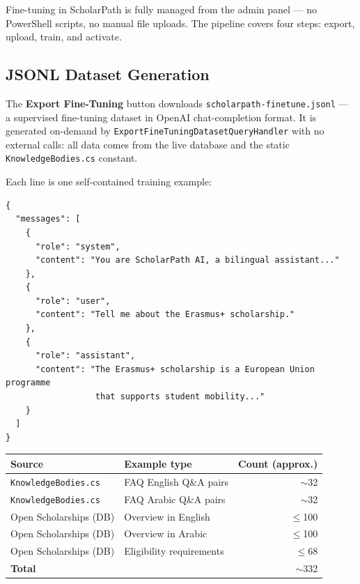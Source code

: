 \documentclass[11pt,a4paper]{article}
\begin{document}
Fine-tuning in ScholarPath is fully managed from the admin panel --- no
PowerShell scripts, no manual file uploads. The pipeline covers four steps:
export, upload, train, and activate.

\subsection{JSONL Dataset Generation}

The \textbf{Export Fine-Tuning} button downloads \texttt{scholarpath-finetune.jsonl} ---
a supervised fine-tuning dataset in OpenAI chat-completion format.
It is generated on-demand by \texttt{ExportFineTuningDatasetQueryHandler} with no
external calls: all data comes from the live database and
the static \texttt{KnowledgeBodies.cs} constant.

Each line is one self-contained training example:

\begin{lstlisting}[language={},caption={Single JSONL training example (truncated)}]
{
  "messages": [
    {
      "role": "system",
      "content": "You are ScholarPath AI, a bilingual assistant..."
    },
    {
      "role": "user",
      "content": "Tell me about the Erasmus+ scholarship."
    },
    {
      "role": "assistant",
      "content": "The Erasmus+ scholarship is a European Union programme
                  that supports student mobility..."
    }
  ]
}
\end{lstlisting}

\begin{center}
\begin{tabular}{llr}
\toprule
\textbf{Source} & \textbf{Example type} & \textbf{Count (approx.)}\\
\midrule
\texttt{KnowledgeBodies.cs} & FAQ English Q\&A pairs & $\sim$32\\
\texttt{KnowledgeBodies.cs} & FAQ Arabic Q\&A pairs & $\sim$32\\
Open Scholarships (DB) & Overview in English & $\leq$100\\
Open Scholarships (DB) & Overview in Arabic & $\leq$100\\
Open Scholarships (DB) & Eligibility requirements & $\leq$68\\
\midrule
\textbf{Total} & & $\sim$332\\
\bottomrule
\end{tabular}
\end{center}
\end{document}
